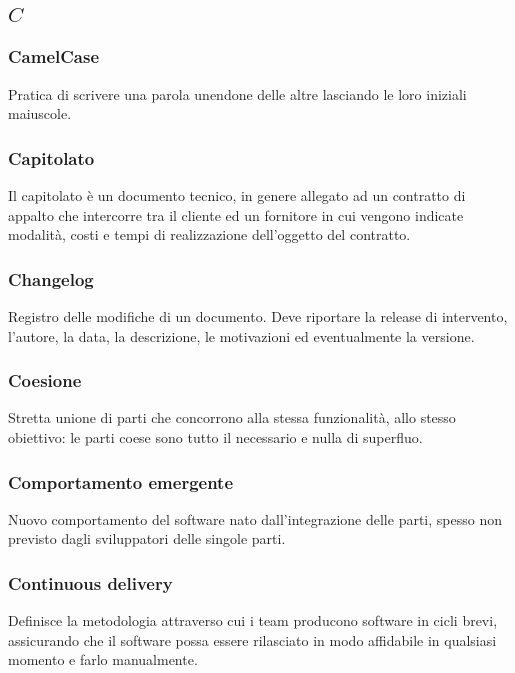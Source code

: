 \subsection*{\quad$C\quad$}
\subsubsection*{CamelCase}
Pratica di scrivere una parola unendone delle altre lasciando le loro iniziali maiuscole.

\subsubsection*{Capitolato}
Il capitolato è un documento tecnico, in genere allegato ad un contratto di appalto che intercorre tra il cliente ed un fornitore in cui vengono indicate modalità, costi e tempi di realizzazione dell'oggetto del contratto.

\subsubsection*{Changelog}
Registro delle modifiche di un documento. Deve riportare la release di intervento, l'autore, la data, la descrizione, le motivazioni ed eventualmente la versione.

\subsubsection*{Coesione}
Stretta unione di parti che concorrono alla stessa funzionalità, allo stesso obiettivo: le parti coese sono tutto il necessario e nulla di superfluo.

\subsubsection*{Comportamento emergente}
Nuovo comportamento del software nato dall'integrazione delle parti, spesso non previsto dagli sviluppatori delle singole parti.

\subsubsection*{Continuous delivery}
Definisce la metodologia attraverso cui i team producono software in cicli brevi, assicurando che il software possa essere rilasciato in modo affidabile in qualsiasi momento e farlo manualmente.

